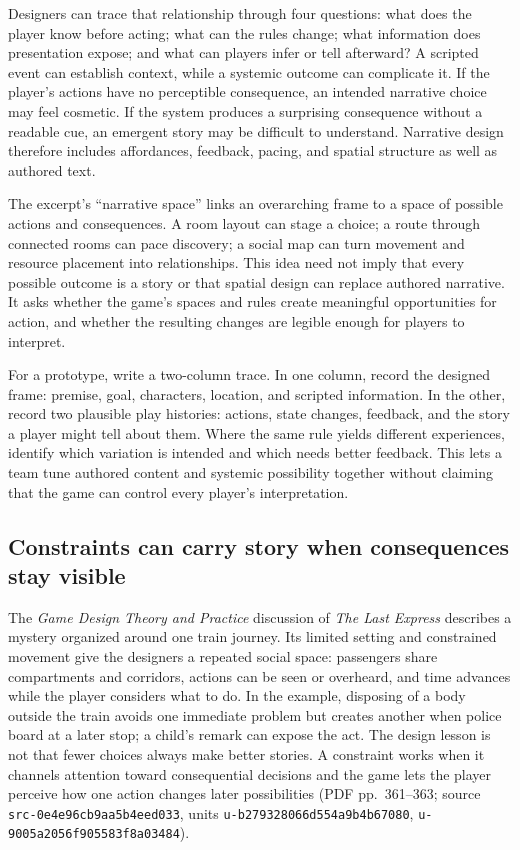 Designers can trace that relationship through four questions: what does the player know before acting; what can the rules change; what information does presentation expose; and what can players infer or tell afterward? A scripted event can establish context, while a systemic outcome can complicate it. If the player's actions have no perceptible consequence, an intended narrative choice may feel cosmetic. If the system produces a surprising consequence without a readable cue, an emergent story may be difficult to understand. Narrative design therefore includes affordances, feedback, pacing, and spatial structure as well as authored text.

The excerpt's ``narrative space'' links an overarching frame to a space of possible actions and consequences. A room layout can stage a choice; a route through connected rooms can pace discovery; a social map can turn movement and resource placement into relationships. This idea need not imply that every possible outcome is a story or that spatial design can replace authored narrative. It asks whether the game's spaces and rules create meaningful opportunities for action, and whether the resulting changes are legible enough for players to interpret.

For a prototype, write a two-column trace. In one column, record the designed frame: premise, goal, characters, location, and scripted information. In the other, record two plausible play histories: actions, state changes, feedback, and the story a player might tell about them. Where the same rule yields different experiences, identify which variation is intended and which needs better feedback. This lets a team tune authored content and systemic possibility together without claiming that the game can control every player's interpretation.

\subsection{Constraints can carry story when consequences stay visible}\label{constraints-can-carry-story-when-consequences-stay-visible}

The \emph{Game Design Theory and Practice} discussion of \emph{The Last Express} describes a mystery organized around one train journey. Its limited setting and constrained movement give the designers a repeated social space: passengers share compartments and corridors, actions can be seen or overheard, and time advances while the player considers what to do. In the example, disposing of a body outside the train avoids one immediate problem but creates another when police board at a later stop; a child's remark can expose the act. The design lesson is not that fewer choices always make better stories. A constraint works when it channels attention toward consequential decisions and the game lets the player perceive how one action changes later possibilities (PDF pp.~361--363; source \texttt{src-0e4e96cb9aa5b4eed033}, units \texttt{u-b279328066d554a9b4b67080}, \texttt{u-9005a2056f905583f8a03484}).

